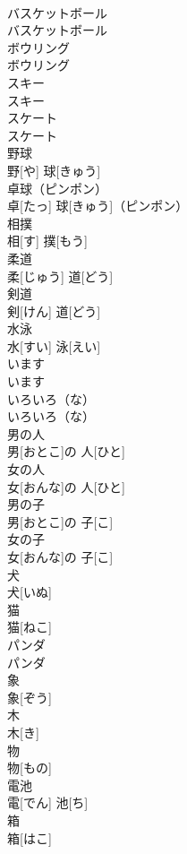 \documentclass[8pt]{extreport}
\begin{document}
\begin{CJK}{UTF8}{min}
\\	バスケットボール	
\\	バスケットボール		
\\	ボウリング	
\\	ボウリング		
\\	スキー	
\\	スキー		
\\	スケート	
\\	スケート		
\\	野球	
\\	野[や] 球[きゅう]		
\\	卓球（ピンポン）	
\\	卓[たっ] 球[きゅう]（ピンポン）		
\\	相撲	
\\	相[す] 撲[もう]		
\\	柔道	
\\	柔[じゅう] 道[どう]		
\\	剣道	
\\	剣[けん] 道[どう]		
\\	水泳	
\\	水[すい] 泳[えい]		
\\	います	
\\	います		
\\	いろいろ（な）	
\\	いろいろ（な）		
\\	男の人	
\\	男[おとこ]の 人[ひと]		
\\	女の人	
\\	女[おんな]の 人[ひと]		
\\	男の子	
\\	男[おとこ]の 子[こ]		
\\	女の子	
\\	女[おんな]の 子[こ]		
\\	犬	
\\	犬[いぬ]		
\\	猫	
\\	猫[ねこ]		
\\	パンダ	
\\	パンダ		
\\	象	
\\	象[ぞう]		
\\	木	
\\	木[き]		
\\	物	
\\	物[もの]		
\\	電池	
\\	電[でん] 池[ち]		
\\	箱	
\\	箱[はこ]		

\end{CJK}
\end{document}

